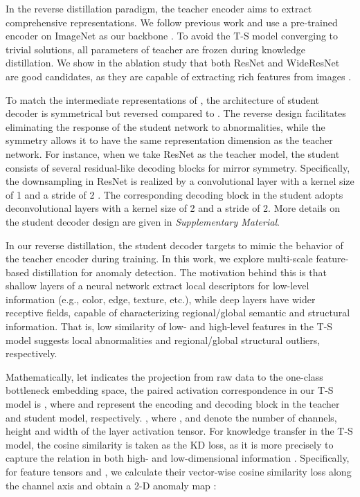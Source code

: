 \documentclass[10pt,twocolumn,letterpaper]{article}
\begin{document}
In the reverse distillation paradigm, the teacher encoder  aims to extract comprehensive representations. We follow previous work and use a pre-trained encoder on ImageNet \cite{imagenet} as our backbone . To avoid the T-S model converging to trivial solutions, all parameters of teacher  are frozen during knowledge distillation. We show in the ablation study that both ResNet \cite{He_2016_CVPR} and WideResNet \cite{BMVC2016_87} are good candidates, as they are capable of extracting rich features from images \cite{panda, padim, us, cutpaste}. 

To match the intermediate representations of , the architecture of student decoder  is symmetrical but reversed compared to . The reverse design facilitates eliminating the response of the student network to abnormalities, while the symmetry allows it to have the same representation dimension as the teacher network. For instance, when we take ResNet as the teacher model, the student  consists of several residual-like decoding blocks for mirror symmetry. Specifically, the downsampling in ResNet is realized by a convolutional layer with a kernel size of 1 and a stride of 2 \cite{He_2016_CVPR}. The corresponding decoding block in the student  adopts deconvolutional layers \cite{deconv} with a kernel size of 2 and a stride of 2. More details on the student decoder design are given in \emph{Supplementary Material}.

In our reverse distillation, the student decoder  targets to mimic the behavior of the teacher encoder  during training. In this work, we explore multi-scale feature-based distillation for anomaly detection. The motivation behind this is that shallow layers of a neural network extract local descriptors for low-level information (e.g., color, edge, texture, etc.), while deep layers have wider receptive fields, capable of characterizing regional/global semantic and structural information. That is, low similarity of low- and high-level features in the T-S model suggests local abnormalities and regional/global structural outliers, respectively. 

Mathematically, let  indicates the projection from raw data  to the one-class bottleneck embedding space, the paired activation correspondence in our T-S model is , where  and  represent the  encoding and decoding block in the teacher and student model, respectively. , where ,  and  denote the number of channels, height and width of the  layer activation tensor. For knowledge transfer in the T-S model, the cosine similarity is taken as the KD loss, as it is more precisely to capture the relation in both high- and low-dimensional information \cite{Zhu_2021_CVPR,Tung_2019_ICCV}. Specifically, for feature tensors  and , we calculate their vector-wise cosine similarity loss along the channel axis and obtain a 2-D anomaly map :
\end{document}

